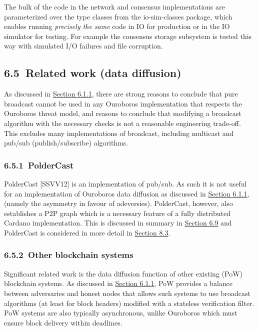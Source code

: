 \documentclass[]{article}
\begin{document}
The bulk of the code in the network and consensus implementations are
parameterized over the type classes from the io-sim-classes package,
which enables running \emph{precisely the same} code in IO for
production or in the IO simulator for testing. For example the consensus
storage subsystem is tested this way with simulated I/O failures and
file corruption.

\hypertarget{related-work-data-diffusion}{%
\subsection{​6.5​~Related work (data
diffusion)}\label{related-work-data-diffusion}}

As discussed in
\protect\hyperlink{interleaving-transmission-and-validation}{{Section
6.1.1}}, there are strong reasons to conclude that pure broadcast cannot
be used in any Ouroboros implementation that respects the Ouroboros
threat model, and reasons to conclude that modifying a broadcast
algorithm with the necessary checks is not a reasonable engineering
trade-off. This excludes many implementations of broadcast, including
multicast and pub/sub (publish/subscribe) algorithms.

\hypertarget{poldercast}{%
\subsubsection{​6.5.1​~PolderCast}\label{poldercast}}

PolderCast {[}SSVV12{]} is an implementation of pub/sub. As such it is
not useful for an implementation of Ouroboros data diffusion as
discussed in
\protect\hyperlink{interleaving-transmission-and-validation}{{Section
6.1.1}}, (namely the asymmetry in favour of adeversies). PolderCast,
however, also establishes a P2P graph which is a necessary feature of a
fully distributed Cardano implementation. This is discussed in summary
in \protect\hyperlink{related-work-decentralisation}{{Section 6.9}} and
PolderCast is considered in more detail in
\protect\hyperlink{poldercast-1}{{Section 8.3}}.

\hypertarget{other-blockchain-systems}{%
\subsubsection{​6.5.2​~Other blockchain
systems}\label{other-blockchain-systems}}

Significant related work is the data diffusion function of other
existing (PoW) blockchain systems. As discussed in
\protect\hyperlink{interleaving-transmission-and-validation}{{Section
6.1.1}}, PoW provides a balance between adversaries and honest nodes
that allows such systems to use broadcast algorithms (at least for block
headers) modified with a stateless verification filter. PoW systems are
also typically asynchronous, unlike Ouroboros which must ensure block
delivery within deadlines.
\end{document}
